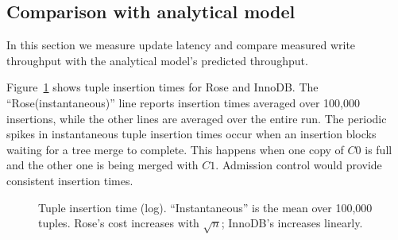 \documentclass{vldb}
\newcommand{\rows}{Rose\xspace}
\newcommand{\rowss}{Rose's\xspace}
\begin{document}


\subsection{Comparison with analytical model}

In this section we measure update latency and compare
measured write throughput with the analytical model's predicted
throughput.

Figure~\ref{fig:avg-tup} shows tuple insertion times for \rows and InnoDB.
The ``\rows (instantaneous)'' line reports insertion times
averaged over 100,000 insertions, while the other lines are averaged
over the entire run.
The periodic spikes in instantaneous tuple
insertion times occur when an insertion blocks waiting
for a tree merge to complete.  This happens when one copy of $C0$ is
full and the other one is being merged with $C1$.  Admission control
would provide consistent insertion times.

\begin{figure}
\centering
{}
\caption{Tuple insertion time (log).  ``Instantaneous'' is the mean over 100,000
  tuples.  \rowss cost increases with $\sqrt{n}$; InnoDB's increases linearly.}
\label{fig:avg-tup}
\end{figure}


\end{document}

